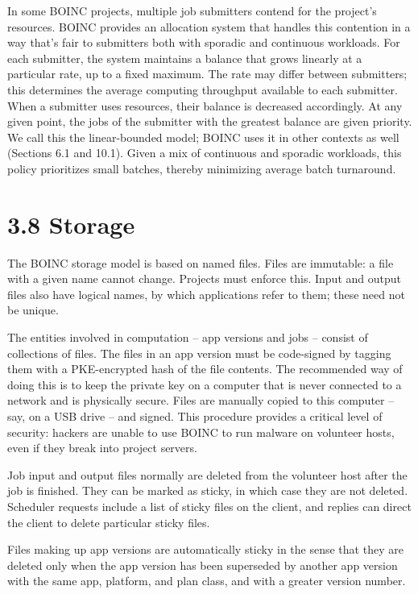 \documentclass[
]{article}
\begin{document}
In some BOINC projects, multiple job submitters contend for the
project's resources. BOINC provides an allocation system that handles
this contention in a way that's fair to submitters both with sporadic
and continuous workloads. For each submitter, the system maintains a
balance that grows linearly at a particular rate, up to a fixed maximum.
The rate may differ between submitters; this determines the average
computing throughput available to each submitter. When a submitter uses
resources, their balance is decreased accordingly. At any given point,
the jobs of the submitter with the greatest balance are given priority.
We call this the linear-bounded model; BOINC uses it in other contexts
as well (Sections 6.1 and 10.1). Given a mix of continuous and sporadic
workloads, this policy prioritizes small batches, thereby minimizing
average batch turnaround.

\section{3.8 Storage}\label{storage}

The BOINC storage model is based on named files. Files are immutable: a
file with a given name cannot change. Projects must enforce this. Input
and output files also have logical names, by which applications refer to
them; these need not be unique.

The entities involved in computation -- app versions and jobs -- consist
of collections of files. The files in an app version must be code-signed
by tagging them with a PKE-encrypted hash of the file contents. The
recommended way of doing this is to keep the private key on a computer
that is never connected to a network and is physically secure. Files are
manually copied to this computer -- say, on a USB drive -- and signed.
This procedure provides a critical level of security: hackers are unable
to use BOINC to run malware on volunteer hosts, even if they break into
project servers.

Job input and output files normally are deleted from the volunteer host
after the job is finished. They can be marked as sticky, in which case
they are not deleted. Scheduler requests include a list of sticky files
on the client, and replies can direct the client to delete particular
sticky files.

Files making up app versions are automatically sticky in the sense that
they are deleted only when the app version has been superseded by
another app version with the same app, platform, and plan class, and
with a greater version number.
\end{document}
